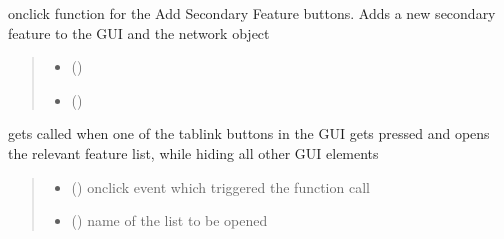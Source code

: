 \documentclass[letterpaper,10pt,english]{sphinxmanual}
\begin{document}
\begin{fulllineitems}
\label{\detokenize{docs_gui/js_api/network_editor/display_editable_network_features:addSecondaryFeature}}
\pysigstartsignatures
{}
\pysigstopsignatures
\sphinxAtStartPar
onclick function for the Add Secondary Feature buttons. Adds a new secondary feature to the GUI and the network object
\begin{quote}\begin{description}
\begin{itemize}
\item {} 
\sphinxAtStartPar
{} () \textendash{} 

\item {} 
\sphinxAtStartPar
{} () \textendash{} 

\end{itemize}

\end{description}\end{quote}

\end{fulllineitems}


\begin{fulllineitems}
\label{\detokenize{docs_gui/js_api/network_editor/display_editable_network_features:openEditableNetworkList}}
\pysigstartsignatures
{}
\pysigstopsignatures
\sphinxAtStartPar
gets called when one of the tablink buttons in the GUI gets pressed and opens the relevant feature list, while hiding all other GUI elements
\begin{quote}\begin{description}
\begin{itemize}
\item {} 
\sphinxAtStartPar
{} () \textendash{} onclick event which triggered the function call

\item {} 
\sphinxAtStartPar
{} () \textendash{} name of the list to be opened

\end{itemize}

\end{description}\end{quote}

\end{fulllineitems}
\end{document}
